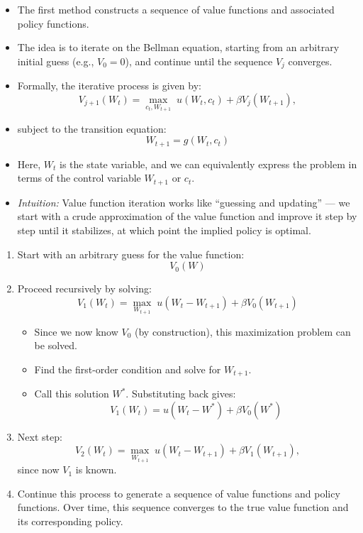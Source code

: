 \documentclass[12pt]{article}
\begin{document}
\begin{itemize}
    \item The first method constructs a sequence of value functions and associated policy functions.

    \item The idea is to iterate on the Bellman equation, starting from an arbitrary initial guess (e.g., \( V_0 = 0 \)), and continue until the sequence \( V_j \) converges.

    \item Formally, the iterative process is given by:
    \[
    V_{j+1}(W_t) = \max_{c_t, W_{t+1}} \; u(W_t, c_t) + \beta V_j(W_{t+1}),
    \]

    \item subject to the transition equation:
    \[
    W_{t+1} = g(W_t, c_t)
    \]

    \item Here, \( W_t \) is the state variable, and we can equivalently express the problem in terms of the control variable \( W_{t+1} \) or \( c_t \).

    \item \textit{Intuition:} Value function iteration works like “guessing and updating” — we start with a crude approximation of the value function and improve it step by step until it stabilizes, at which point the implied policy is optimal.
\end{itemize}

\begin{enumerate}
    \item Start with an arbitrary guess for the value function:
    \[
    V_0(W)
    \]

    \item Proceed recursively by solving:
    \[
    V_1(W_t) = \max_{W_{t+1}} \; u(W_t - W_{t+1}) + \beta V_0(W_{t+1})
    \]

    \begin{itemize}
        \item Since we now know \( V_0 \) (by construction), this maximization problem can be solved.  
        \item Find the first-order condition and solve for \( W_{t+1} \).  
        \item Call this solution \( W^* \). Substituting back gives:
        \[
        V_1(W_t) = u(W_t - W^*) + \beta V_0(W^*)
        \]
    \end{itemize}

    \item Next step:
    \[
    V_2(W_t) = \max_{W_{t+1}} \; u(W_t - W_{t+1}) + \beta V_1(W_{t+1}),
    \]
    since now \( V_1 \) is known.

    \item Continue this process to generate a sequence of value functions and policy functions.  
    Over time, this sequence converges to the true value function and its corresponding policy.
\end{enumerate}
\end{document}
